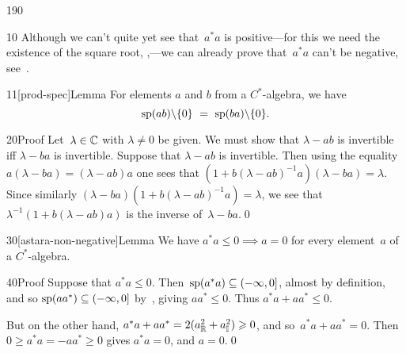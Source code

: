 \begin{parsec}{190}
\begin{point}{10}%
Although we can't quite yet see that~$a^*a$
is positive---for this we need the existence of the square root, 
    ,---we
    can already prove that~$a^*a$ can't be negative,
    see~.
\end{point}
\begin{point}{11}[prod-spec]{Lemma}%
For elements $a$ and $b$ from a $C^*$-algebra,
we have
\begin{equation*}
\spec(ab)\backslash\{0\}\ =\ \spec(ba)\backslash\{0\}.
\end{equation*}%
\spacingfix{}%
\begin{point}{20}{Proof}%
Let~$\lambda\in \mathbb{C}$ with $\lambda\neq 0$ be given.
We must show that $\lambda - ab$ is invertible
iff $\lambda - ba$ is invertible.
Suppose that $\lambda-ab$ is invertible.
Then using the equality $a(\lambda-ba)=(\lambda-ab)a$
one sees that $(1+b(\lambda-ab)^{-1}a)(\lambda-ba)=\lambda$.
Since similarly $(\lambda-ba)(1+b(\lambda-ab)^{-1}a)=\lambda$,
we see that $\lambda^{-1}(1+b(\lambda-ab)a)$
is the inverse of~$\lambda-ba$.\qed
\end{point}
\end{point}
\begin{point}{30}[astara-non-negative]{Lemma}%
We have $a^*a  \leq 0\implies a=0$
for every element~$a$ of a $C^*$-algebra.
\begin{point}{40}{Proof}%
Suppose that $a^*a\leq 0$.
Then~$\mathrm{sp}(a^*a)\subseteq (-\infty,0]$, almost by definition,
and so $\mathrm{sp}(aa^*)\subseteq (-\infty,0]$ by~,
giving $aa^*\leq 0$.
Thus $a^*a+aa^*\leq 0$.

But on the other hand, 
$a^*a+aa^* = 2(a_{\mathbb{R}}^2 + a_{\mathbb{I}}^2) \geqslant 0$,
and so~$a^*a+aa^*=0$.
Then $0\geq a^*a=-aa^*\geq 0$ gives $a^*a=0$,
and $a=0$.\qed
\end{point}
\end{point}
\end{parsec}
